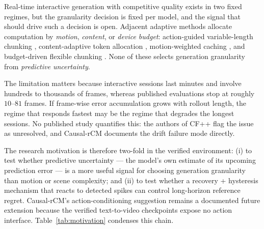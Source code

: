 \documentclass[11pt,a4paper]{article}
\begin{document}
Real-time interactive generation with competitive quality exists in two fixed regimes, but the granularity decision is fixed per model, and the signal that should drive such a decision is open. Adjacent adaptive methods allocate computation by \emph{motion}, \emph{content}, or \emph{device budget}: action-guided variable-length chunking \parencite{shangLongScapeAdvancingLongHorizon2025}, content-adaptive token allocation \parencite{xiongEVATokAdaptiveLength2026,liLearningAdaptiveTemporally2025}, motion-weighted caching \parencite{xuMotionAwareCachingEfficient2026}, and budget-driven flexible chunking \parencite{maFlexForcingUnifiedAutoregressive2026}. None of these selects generation granularity from \emph{predictive uncertainty}.

The limitation matters because interactive sessions last minutes and involve hundreds to thousands of frames, whereas published evaluations stop at roughly $10$--$81$ frames. If frame-wise error accumulation grows with rollout length, the regime that responds fastest may be the regime that degrades the longest sessions. No published study quantifies this: the authors of CF++ flag the issue as unresolved, and Causal-rCM documents the drift failure mode directly.

The research motivation is therefore two-fold in the verified environment: (i) to test whether predictive uncertainty --- the model's own estimate of its upcoming prediction error --- is a more useful signal for choosing generation granularity than motion or scene complexity; and (ii) to test whether a recovery + hysteresis mechanism that reacts to detected spikes can control long-horizon reference regret. Causal-rCM's action-conditioning suggestion remains a documented future extension because the verified text-to-video checkpoints expose no action interface. Table~\ref{tab:motivation} condenses this chain.
\end{document}
